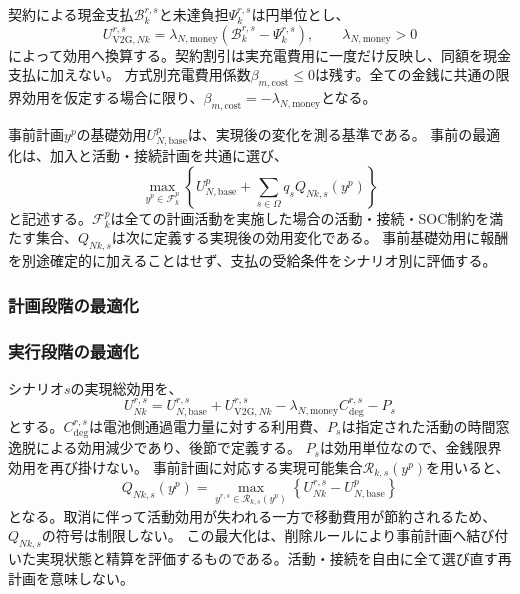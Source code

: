 契約による現金支払$\mathcal B_k^{r,s}$と未達負担$\Psi_k^{r,s}$は円単位とし、
\begin{equation}
 U_{\mathrm{V2G},Nk}^{r,s}
 =\lambda_{N,\mathrm{money}}\left(\mathcal B_k^{r,s}-\Psi_k^{r,s}\right),
 \qquad\lambda_{N,\mathrm{money}}>0
 \label{eq:mf-v2g-utility}
\end{equation}
によって効用へ換算する。契約割引は実充電費用に一度だけ反映し、同額を現金支払に加えない。
方式別充電費用係数$\beta_{m,\mathrm{cost}}\le0$は残す。全ての金銭に共通の限界効用を仮定する場合に限り、$\beta_{m,\mathrm{cost}}=-\lambda_{N,\mathrm{money}}$となる。

事前計画$y^p$の基礎効用$U_{N,\mathrm{base}}^p$は、実現後の変化を測る基準である。
事前の最適化は、加入と活動・接続計画を共通に選び、
\begin{equation}
 \max_{y^p\in\mathcal F_k^p}
 \left\{U_{N,\mathrm{base}}^p+\sum_{s\in\Omega}q_s Q_{Nk,s}(y^p)\right\}
 \label{eq:mf-preplanning}
\end{equation}
と記述する。$\mathcal F_k^p$は全ての計画活動を実施した場合の活動・接続・SOC制約を満たす集合、$Q_{Nk,s}$は次に定義する実現後の効用変化である。
事前基礎効用に報酬を別途確定的に加えることはせず、支払の受給条件をシナリオ別に評価する。



\subsubsection{計画段階の最適化}

\subsubsection{実行段階の最適化}

シナリオ$s$の実現総効用を、
\begin{equation}
 U_{Nk}^{r,s}
 =U_{N,\mathrm{base}}^{r,s}+U_{\mathrm{V2G},Nk}^{r,s}
  -\lambda_{N,\mathrm{money}}C_{\mathrm{deg}}^{r,s}-P_s
 \label{eq:mf-realized-utility}
\end{equation}
とする。$C_{\mathrm{deg}}^{r,s}$は電池側通過電力量に対する利用費、$P_s$は指定された活動の時間窓逸脱による効用減少であり、後節で定義する。
$P_s$は効用単位なので、金銭限界効用を再び掛けない。
事前計画に対応する実現可能集合$\mathcal R_{k,s}(y^p)$を用いると、
\begin{equation}
 Q_{Nk,s}(y^p)
 =\max_{y^{r,s}\in\mathcal R_{k,s}(y^p)}
 \left\{U_{Nk}^{r,s}-U_{N,\mathrm{base}}^p\right\}
 \label{eq:mf-recourse}
\end{equation}
となる。取消に伴って活動効用が失われる一方で移動費用が節約されるため、$Q_{Nk,s}$の符号は制限しない。
この最大化は、削除ルールにより事前計画へ結び付いた実現状態と精算を評価するものである。活動・接続を自由に全て選び直す再計画を意味しない。

